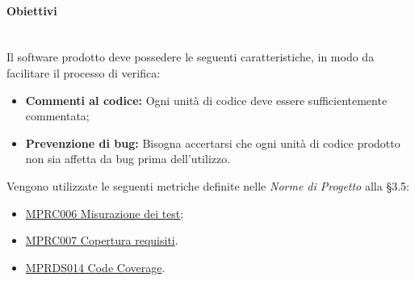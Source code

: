 \paragraph{Obiettivi}\mbox{}\\[0.4cm]
Il software prodotto deve possedere le seguenti caratteristiche, in modo da facilitare il processo di verifica:
\begin{itemize}
	\item \textbf{Commenti al codice:} Ogni unità di codice deve essere sufficientemente commentata;
	\item \textbf{Prevenzione di bug:} Bisogna accertarsi che ogni unità di codice prodotto non sia affetta da bug prima dell'utilizzo.
\end{itemize}
Vengono utilizzate le seguenti metriche definite nelle \textit{Norme di Progetto} alla §3.5:
\begin{itemize}
	\item \label{metrica_processo_MPRC006}\hyperref[sec:qprocesso_tabella_metriche_sw_obiettivi_MPRC006]{MPRC006 Misurazione dei test};
	\item \label{metrica_processo_MPRC007}\hyperref[sec:qprocesso_tabella_metriche_sw_obiettivi_MPRC007]{MPRC007 Copertura requisiti}.
	\item \label{metrica_processo_MPRDS014}\hyperref[sec:qprocesso_tabella_metriche_sw_obiettivi_MPRDS014]{MPRDS014 Code Coverage}.
\end{itemize}


